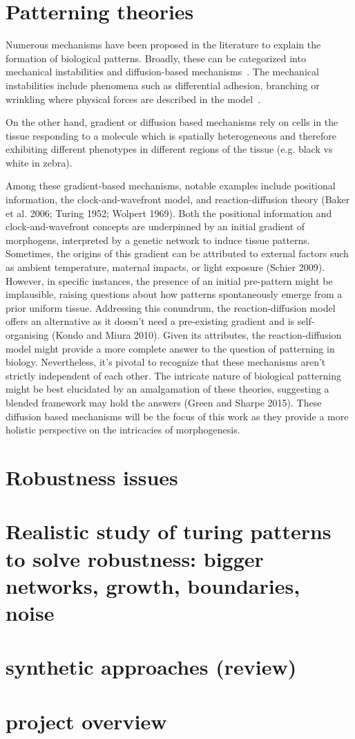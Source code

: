 \section{Patterning theories}
Numerous mechanisms have been proposed in the literature to explain the formation of biological patterns.
Broadly, these can be categorized into mechanical instabilities and diffusion-based mechanisms~\autocite{kosmrlj2020_2}.
The mechanical instabilities include phenomena such as differential adhesion, branching or wrinkling where physical forces are described in the model~\cite{Scholes2017}.

On the other hand, gradient or diffusion based mechanisms rely on cells in the tissue responding to a molecule which is spatially heterogeneous and therefore exhibiting different phenotypes in different regions of the tissue (e.g. black vs white in zebra).

Among these gradient-based mechanisms, notable examples include positional information, the clock-and-wavefront model, and reaction-diffusion theory (Baker et al. 2006; Turing 1952; Wolpert 1969).
Both the positional information and clock-and-wavefront concepts are underpinned by an initial gradient of morphogens, interpreted by a genetic network to induce tissue patterns. Sometimes, the origins of this gradient can be attributed to external factors such as ambient temperature, maternal impacts, or light exposure (Schier 2009).
However, in specific instances, the presence of an initial pre-pattern might be implausible, raising questions about how patterns spontaneously emerge from a prior uniform tissue.
Addressing this conundrum, the reaction-diffusion model offers an alternative as it doesn't need a pre-existing gradient and is self-organising (Kondo and Miura 2010). Given its attributes, the reaction-diffusion model might provide a more complete answer to the question of patterning in biology. Nevertheless, it's pivotal to recognize that these mechanisms aren't strictly independent of each other. The intricate nature of biological patterning might be best elucidated by an amalgamation of these theories, suggesting a blended framework may hold the answers (Green and Sharpe 2015).
These diffusion based mechanisms will be the focus of this work as they provide a more holistic perspective on the intricacies of morphogenesis.

\section{Robustness issues}

\section{Realistic study of turing patterns to solve robustness: bigger networks, growth, boundaries, noise}
\section{ synthetic approaches (review)}

\section{project overview}

